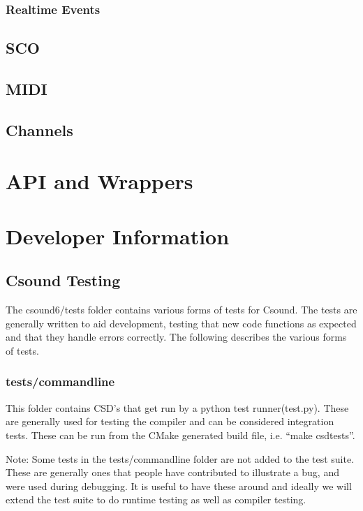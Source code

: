 \documentclass[]{book}
\begin{document}
\subsection{Realtime Events}

\section{SCO}

\section{MIDI}

\section{Channels}


\chapter{API and Wrappers}



\chapter{Developer Information}

\section{Csound Testing}

The csound6/tests folder contains various forms of tests for Csound. The
tests are generally written to aid development, testing that new code
functions as expected and that they handle errors correctly. The
following describes the various forms of tests.

\subsection{tests/commandline}

This folder contains CSD's that get run by a python test
runner(test.py). These are generally used for testing the compiler and
can be considered integration tests. These can be run from the CMake
generated build file, i.e. ``make csdtests''.

Note: Some tests in the tests/commandline folder are not added to the
test suite. These are generally ones that people have contributed to
illustrate a bug, and were used during debugging. It is useful to have
these around and ideally we will extend the test suite to do runtime
testing as well as compiler testing.
\end{document}
